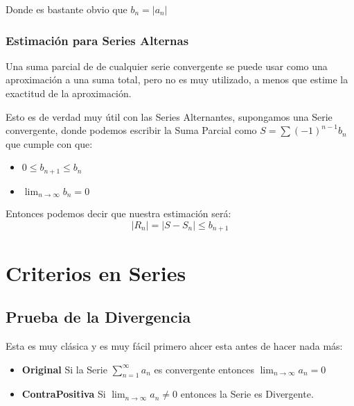 \documentclass[12pt]{report}							    %
\begin{document}
        Donde es bastante obvio que $b_n = |a_n|$


    \subsection{Estimación para Series Alternas}
        Una suma parcial de de cualquier serie convergente se puede usar como una
        aproximación a una suma total, pero no es muy utilizado, a menos que estime
        la exactitud de la aproximación.

        Esto es de verdad muy útil con las Series Alternantes, supongamos una Serie
        convergente, donde podemos escribir la Suma Parcial como $S = \sum (-1)^{n-1}b_n$
        que cumple con que:
        \begin{itemize}
            \item $ 0 \leq b_{n+1} \leq b_n$
            \item $ \lim_{n \to \infty} b_n = 0$
        \end{itemize}

        Entonces podemos decir que nuestra estimación será:
        \begin{equation}
            |R_n| = |S - S_n| \leq b_{n+1}
        \end{equation}







\clearpage
\chapter{Criterios en Series}

    \clearpage
    \section{Prueba de la Divergencia}
    Esta es muy clásica y es muy fácil primero ahcer esta antes
    de hacer nada más:

    \begin{itemize}
        \item \textbf{Original} Si la Serie $\sum_{n=1}^{\infty} a_n$ es
        convergente entonces $\lim_{n \to \infty} a_n = 0$

        \item \textbf{ContraPositiva} Si $\lim_{n \to \infty} a_n \neq 0$ entonces la Serie es Divergente.
    \end{itemize}
\end{document}
